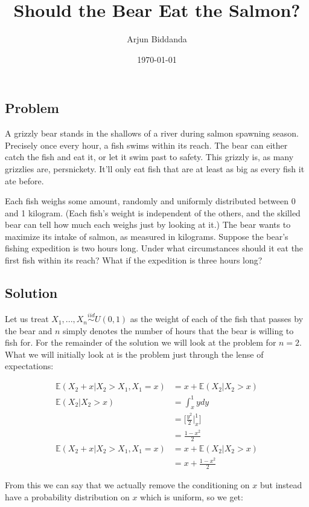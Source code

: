 \documentclass[12pt]{article}
\title{Should the Bear Eat the Salmon?}
\author{Arjun Biddanda}
\date{\today}
\begin{document}
\maketitle
\linenumbers

\subsection*{Problem}
A grizzly bear stands in the shallows of a river during salmon spawning season. Precisely once every hour, a fish swims within its reach. The bear can either catch the fish and eat it, or let it swim past to safety. This grizzly is, as many grizzlies are, persnickety. It’ll only eat fish that are at least as big as every fish it ate before.

 Each fish weighs some amount, randomly and uniformly distributed between 0 and 1 kilogram. (Each fish’s weight is independent of the others, and the skilled bear can tell how much each weighs just by looking at it.) The bear wants to maximize its intake of salmon, as measured in kilograms. Suppose the bear’s fishing expedition is two hours long. Under what circumstances should it eat the first fish within its reach? What if the expedition is three hours long?

\subsection*{Solution}

Let us treat $X_1, ..., X_n \overset{iid}{\sim} U(0,1)$ as the weight of each of the fish that passes by the bear and $n$ simply denotes the number of hours that the bear is willing to fish for. For the remainder of the solution we will look at the problem for $n=2$. What we will initially look at is the problem just through the lense of expectations:

$$
	\begin{aligned}
		\mathbb{E}(X_2 + x | X_2 > X_1, X_1 = x) &= x + \mathbb{E}(X_2 | X_2 > x)\\
		\mathbb{E}(X_2 | X_2 > x) &= \int_x^1 y dy\\
		&= \bigg[\frac{y^2}{2} \bigg\vert_x^1\bigg]\\
		&= \frac{1-x^2}{2}\\
		\mathbb{E}(X_2 + x | X_2 > X_1, X_1 = x) &= x + \mathbb{E}(X_2 | X_    2 > x)\\
		&= x + \frac{1-x^2}{2}
	\end{aligned}
$$

From this we can say that we actually remove the conditioning on $x$ but instead have a probability distribution on $x$ which is uniform, so we get: 
\end{document}
